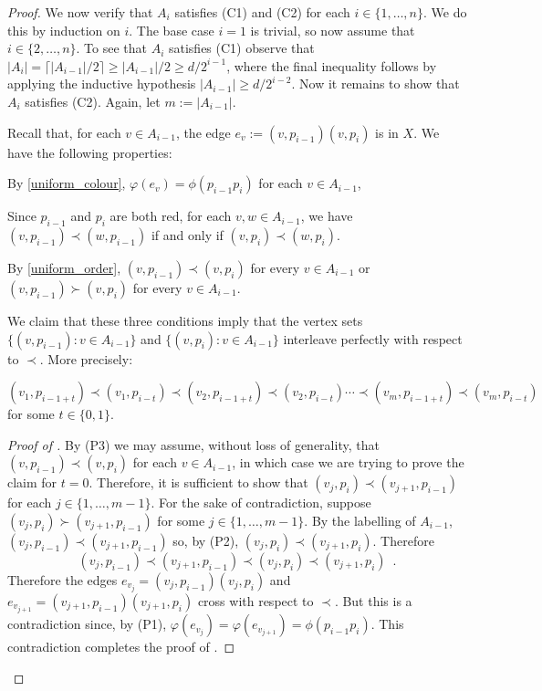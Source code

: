 \documentclass[kpfonts]{patmorin}
\renewcommand{\ge}{\geqslant}
\begin{document}
\begin{proof}
	We now verify that $A_i$ satisfies (C1) and (C2) for each $i\in\{1,\ldots,n\}$.  We do this by induction on $i$. The base case $i=1$ is trivial, so now assume that $i\in\{2,\ldots,n\}$.   To see that $A_i$ satisfies (C1) observe that $|A_i|=\lceil |A_{i-1}|/2\rceil \ge |A_{i-1}|/2\ge d/2^{i-1}$, where the final inequality follows by applying the inductive hypothesis $|A_{i-1}|\ge d/2^{i-2}$.  Now it remains to show that $A_i$ satisfies (C2). Again, let $m:= |A_{i-1}|$. 

    Recall that, for each $v\in A_{i-1}$, the edge $e_v:=(v,p_{i-1})(v,p_i)$ is in $X$.  We have the following properties:
    \begin{compactenum}[(P1)]
        \item By \cref{uniform_colour}, $\varphi(e_v)=\phi(p_{i-1}p_i)$ for each $v\in A_{i-1}$, 
        \item Since $p_{i-1}$ and $p_i$ are both red,  for each $v,w\in A_{i-1}$, we have $(v,p_{i-1})\prec (w,p_{i-1})$ if and only if $(v,p_{i})\prec (w,p_{i})$.
        \item By \cref{uniform_order}, $(v,p_{i-1})\prec (v,p_i)$ for every $v\in A_{i-1}$ or $(v,p_{i-1})\succ (v,p_i)$ for every $v\in A_{i-1}$.
    \end{compactenum}
We claim that these three conditions imply that the vertex sets $\{(v,p_{i-1}):v\in A_{i-1}\}$ and $\{(v,p_i):v\in A_{i-1}\}$ interleave perfectly with respect to $\prec$.     More precisely:
    
	\begin{clm} 
		$(v_1,p_{i-1+t})\prec (v_1,p_{i-t}) \prec (v_2,p_{i-1+t}) \prec (v_2,p_{i-t}) \cdots \prec (v_m,p_{i-1+t}) \prec (v_m,p_{i-t})$ 
		for some $t\in\{0,1\}$.
	\end{clm}
	
	\begin{proof}[Proof of ]
		By (P3) we may assume, without loss of generality, that $(v,p_{i-1})\prec (v,p_i)$ for each $v\in A_{i-1}$, in which case we are trying to prove the claim for $t=0$.  Therefore, it is sufficient to show that $(v_j,p_i)\prec (v_{j+1},p_{i-1})$ for each $j\in\{1,\ldots,m-1\}$.  For the sake of contradiction, suppose $(v_j,p_{i})\succ (v_{j+1},p_{i-1})$ for some $j\in\{1,\ldots,m-1\}$. By the labelling of $A_{i-1}$,  $(v_j,p_{i-1})\prec (v_{j+1},p_{i-1})$ so, by (P2),  $(v_{j},p_i) \prec (v_{j+1},p_i)$.  Therefore
		\[
			(v_j,p_{i-1})\prec (v_{j+1},p_{i-1})\prec(v_{j},p_i) \prec
		   (v_{j+1}, p_i) \enspace .
	   	\]
		Therefore the edges $e_{v_j}=(v_j,p_{i-1})(v_j,p_{i})$ and $e_{v_{j+1}}=(v_{j+1},p_{i-1})(v_{j+1},p_i)$ cross with respect to $\prec$.  But this is a contradiction since, by (P1),  $\varphi(e_{v_j}) =\varphi(e_{v_{j+1}})=\phi(p_{i-1}p_i)$.
		This contradiction completes the proof of .
	\end{proof}


\end{proof}
\end{document}
